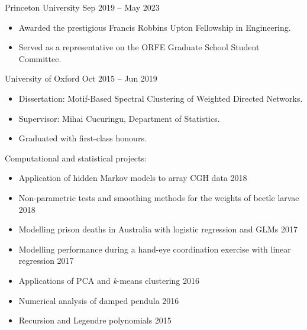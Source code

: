 \documentclass[
  date,
  number,
]{wgu-cv}
\begin{document}
\maketitle





{Princeton University}
{Sep 2019 -- May 2023}

\begin{itemize}
	\item Awarded the prestigious Francis Robbins Upton Fellowship in Engineering.
  \item Served as a representative on the ORFE Graduate School Student Committee.
\end{itemize}


{University of Oxford}
{Oct 2015 -- Jun 2019}

\begin{itemize}
  \item Dissertation:
    Motif-Based Spectral Clustering of Weighted Directed Networks.
  \item Supervisor:
    Mihai Cucuringu,
    Department of Statistics.
  \item Graduated with first-class honours.
\end{itemize}

Computational and statistical projects:

\begin{itemize}
	\item Application of hidden Markov models to array CGH data
    \hfill 2018%
	\item Non-parametric tests and smoothing methods for
    the weights of beetle larvae
    \hfill 2018%
	\item Modelling prison deaths in Australia with logistic regression and GLMs
    \hfill 2017%
	\item Modelling performance during a hand-eye coordination exercise with
    linear regression
    \hfill 2017%
	\item Applications of PCA and \textit{k}-means clustering
    \hfill 2016%
	\item Numerical analysis of damped pendula
    \hfill 2016%
	\item Recursion and Legendre polynomials
    \hfill 2015%
\end{itemize}
\end{document}
